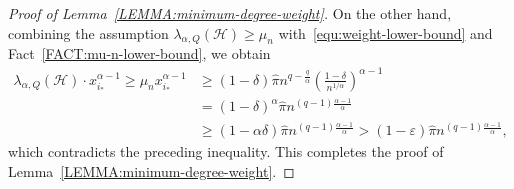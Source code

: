 \documentclass[11pt,a4paper]{article}
\begin{document}
\begin{proof}[Proof of Lemma~\ref{LEMMA:minimum-degree-weight}]
    On the other hand, combining the assumption $\lambda_{\alpha,Q}(\mathcal{H}) \ge \mu_{n}$ with~\eqref{equ:weight-lower-bound} and Fact~\ref{FACT:mu-n-lower-bound}, we obtain 
    \begin{align*}
        \lambda_{\alpha,Q}(\mathcal{H}) \cdot x_{i_{\ast}}^{\alpha-1}
        \ge \mu_{n} x_{i_{\ast}}^{\alpha-1}
        & \ge (1-\delta) \hat{\pi}  n^{q - \frac{q}{\alpha}} \left(\frac{1-\delta}{n^{1/\alpha}}\right)^{\alpha-1} \\
        & = (1-\delta)^{\alpha} \hat{\pi} n^{(q-1)\frac{\alpha-1}{\alpha}} \\
        & \ge (1-\alpha\delta) \hat{\pi} n^{(q-1)\frac{\alpha-1}{\alpha}}
        > (1- \varepsilon) \hat{\pi} n^{(q-1)\frac{\alpha-1}{\alpha}}, 
    \end{align*}
    which contradicts the preceding inequality. 
    This completes the proof of Lemma~\ref{LEMMA:minimum-degree-weight}. 
\end{proof}%
\end{document}
